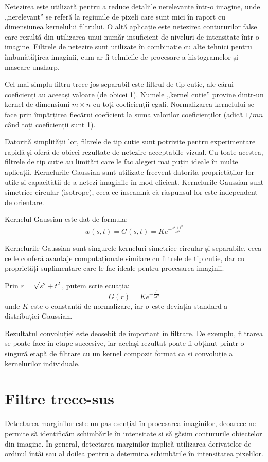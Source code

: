 \documentclass[a4paper,12pt]{report}
\begin{document}
Netezirea este utilizată pentru a reduce detaliile nerelevante într-o imagine, unde „nerelevant” se referă la regiunile de pixeli care sunt mici în raport cu dimensiunea kernelului filtrului. O altă aplicație este netezirea contururilor false care rezultă din utilizarea unui număr insuficient de niveluri de intensitate într-o imagine. Filtrele de netezire sunt utilizate în combinație cu alte tehnici pentru îmbunătățirea imaginii, cum ar fi tehnicile de procesare a histogramelor și mascare unsharp.

Cel mai simplu filtru trece-jos separabil este filtrul de tip cutie, ale cărui coeficienți au aceeași valoare (de obicei 1). Numele „kernel cutie” provine dintr-un kernel de dimensiuni \(m \times n\) cu toți coeficienții egali. Normalizarea kernelului se face prin împărțirea fiecărui coeficient la suma valorilor coeficienților (adică \(1 / mn\) când toți coeficienții sunt 1).

Datorită simplității lor, filtrele de tip cutie sunt potrivite pentru experimentare rapidă și oferă de obicei rezultate de netezire acceptabile vizual. Cu toate acestea, filtrele de tip cutie au limitări care le fac alegeri mai puțin ideale în multe aplicații. Kernelurile Gaussian sunt utilizate frecvent datorită proprietăților lor utile și capacității de a netezi imaginile în mod eficient. Kernelurile Gaussian sunt simetrice circular (isotrope), ceea ce înseamnă că răspunsul lor este independent de orientare.

Kernelul Gaussian este dat de formula:
\[
    w(s,t) = G(s,t) = K e^{-\frac{s^2 + t^2}{2\sigma^2}}
\]

Kernelurile Gaussian sunt singurele kerneluri simetrice circular și separabile, ceea ce le conferă avantaje computaționale similare cu filtrele de tip cutie, dar cu proprietăți suplimentare care le fac ideale pentru procesarea imaginii.

Prin \(r = \sqrt{s^2 + t^2}\), putem scrie ecuația:
\[
    G(r) = K e^{-\frac{r^2}{2\sigma^2}}
\]
unde \(K\) este o constantă de normalizare, iar \(\sigma\) este deviația standard a distribuției Gaussian.

Rezultatul convoluției este deosebit de important în filtrare. De exemplu, filtrarea se poate face în etape succesive, iar același rezultat poate fi obținut printr-o singură etapă de filtrare cu un kernel compozit format ca și convoluție a kernelurilor individuale.

\section{Filtre trece-sus}
Detectarea marginilor este un pas esențial în procesarea imaginilor, deoarece ne permite să identificăm schimbările în intensitate și să găsim contururile obiectelor din imagine. În general, detectarea marginilor implică utilizarea derivatelor de ordinul întâi sau al doilea pentru a determina schimbările în intensitatea pixelilor.
\end{document}
